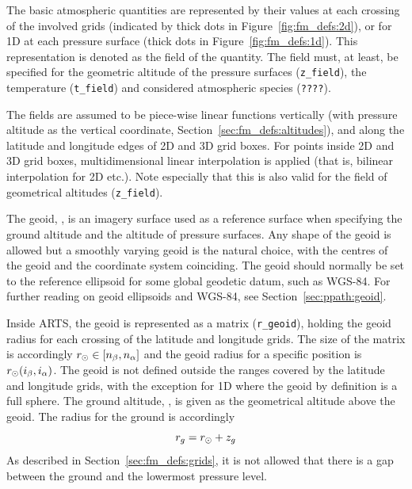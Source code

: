The basic atmospheric quantities are represented by their values at
each crossing of the involved grids (indicated by thick dots in
Figure~\ref{fig:fm_defs:2d}), or for 1D at each pressure surface
(thick dots in Figure~\ref{fig:fm_defs:1d}). This representation is
denoted as the field of the quantity. The field must, at least, be
specified for the geometric altitude of the pressure surfaces
(\verb|z_field|), the temperature (\verb|t_field|) and considered
atmospheric species (\verb|????|).

The fields are assumed to be piece-wise linear functions vertically
(with pressure altitude as the vertical coordinate,
Section~\ref{sec:fm_defs:altitudes}), and along the latitude and
longitude edges of 2D and 3D grid boxes. For points inside 2D and 3D
grid boxes, multidimensional linear interpolation is applied (that is,
bilinear interpolation for 2D etc.). Note especially that this is also
valid for the field of geometrical altitudes (\verb|z_field|).


\label{sec:fm_defs:geoid}

The geoid, \aRds{\odot}, is an imagery surface used as a reference
surface when specifying the ground altitude and the altitude of
pressure surfaces. Any shape of the geoid is allowed but a smoothly
varying geoid is the natural choice, with the centres of the geoid and
the coordinate system coinciding. The geoid should normally be set to
the reference ellipsoid for some global geodetic datum, such as
WGS-84. For further reading on geoid ellipsoids and WGS-84, see
Section~\ref{sec:ppath:geoid}.

Inside ARTS, the geoid is represented as a matrix (\verb|r_geoid|),
holding the geoid radius for each crossing of the latitude and
longitude grids. The size of the matrix is accordingly $r_{\odot}
\in [n_{\beta},n_{\alpha}]$ and the geoid radius for a
specific position is $r_{\odot}(i_{\beta},i_{\alpha})$. The
geoid is not defined outside the ranges covered by the latitude and
longitude grids, with the exception for 1D where the geoid by
definition is a full sphere. 
The ground altitude, , is given as the geometrical altitude
above the geoid. The radius for the ground is accordingly
\begin{equation}
  r_{g} = r_{\odot} + z_{g}
 \label{eq:fm_defs:zground}
\end{equation}
As described in
Section~\ref{sec:fm_defs:grids}, it is not allowed that there is a gap
between the ground and the lowermost pressure level.

